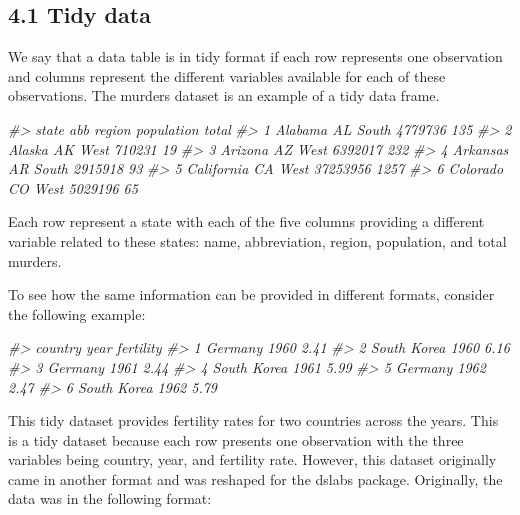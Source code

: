 \documentclass[
]{article}
\newenvironment{Shaded}{\begin{snugshade}}{\end{snugshade}}
\newcommand{\CommentTok}[1]{\textcolor[rgb]{0.56,0.35,0.01}{\textit{#1}}}
\begin{document}
\hypertarget{tidy-data}{%
\subsection{4.1 Tidy data}\label{tidy-data}}

We say that a data table is in tidy format if each row represents one
observation and columns represent the different variables available for
each of these observations. The murders dataset is an example of a tidy
data frame.

\begin{Shaded}
\begin{Highlighting}[]
\CommentTok{\#\textgreater{}        state abb region population total}
\CommentTok{\#\textgreater{} 1    Alabama  AL  South    4779736   135}
\CommentTok{\#\textgreater{} 2     Alaska  AK   West     710231    19}
\CommentTok{\#\textgreater{} 3    Arizona  AZ   West    6392017   232}
\CommentTok{\#\textgreater{} 4   Arkansas  AR  South    2915918    93}
\CommentTok{\#\textgreater{} 5 California  CA   West   37253956  1257}
\CommentTok{\#\textgreater{} 6   Colorado  CO   West    5029196    65}
\end{Highlighting}
\end{Shaded}

Each row represent a state with each of the five columns providing a
different variable related to these states: name, abbreviation, region,
population, and total murders.

To see how the same information can be provided in different formats,
consider the following example:

\begin{Shaded}
\begin{Highlighting}[]
\CommentTok{\#\textgreater{}       country year fertility}
\CommentTok{\#\textgreater{} 1     Germany 1960      2.41}
\CommentTok{\#\textgreater{} 2 South Korea 1960      6.16}
\CommentTok{\#\textgreater{} 3     Germany 1961      2.44}
\CommentTok{\#\textgreater{} 4 South Korea 1961      5.99}
\CommentTok{\#\textgreater{} 5     Germany 1962      2.47}
\CommentTok{\#\textgreater{} 6 South Korea 1962      5.79}
\end{Highlighting}
\end{Shaded}

This tidy dataset provides fertility rates for two countries across the
years. This is a tidy dataset because each row presents one observation
with the three variables being country, year, and fertility rate.
However, this dataset originally came in another format and was reshaped
for the dslabs package. Originally, the data was in the following
format:
\end{document}
